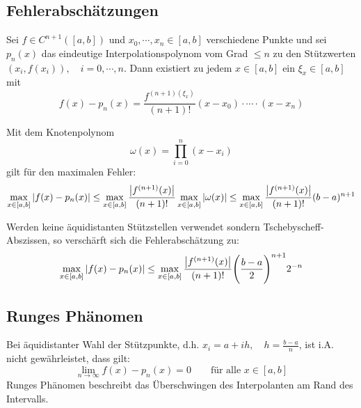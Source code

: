         \subsection{Fehlerabschätzungen}
            Sei \( f \in C^{n+1}([a, b]) \) und \( x_0, \cdots, x_n \in [a, b] \) verschiedene Punkte und sei \( p_n(x) \) das eindeutige Interpolationspolynom vom Grad \( \leq n \) zu den Stützwerten \( (x_i, f(x_i)), \quad i = 0, \cdots, n \). Dann existiert zu jedem \( x \in [a, b] \) ein \( \xi_x \in [a, b] \) mit
            \begin{equation*}
	            f(x) - p_n(x) = \frac{f^{(n + 1)(\xi_x)}}{(n + 1)!} (x - x_0) \cdot \cdots \cdot (x - x_n)
            \end{equation*}
            
            Mit dem Knotenpolynom \[ \omega(x) = \prod_{i = 0}^n (x - x_i) \] gilt für den maximalen Fehler:
            \begin{equation*}
	            \max_{x \in [a, b]} \abs{f(x) - p_n(x)} \leq \max_{x \in [a, b]} \frac{\abs{f^{(n + 1)}(x)}}{(n + 1)!} \max_{x \in [a, b]} \abs{\omega(x)} \leq \max_{x \in [a, b]} \frac{\abs{f^{(n + 1)}(x)}}{(n + 1)!} (b - a)^{n+1}
            \end{equation*}
            
            Werden keine äquidistanten Stützstellen verwendet sondern Tschebyscheff-Abszissen, so verschärft sich die Fehlerabschätzung zu:
            \begin{equation*}
	            \max_{ x \in [a,b] } \abs{f(x) - p_n(x)} \leq \max_{x \in [a, b]} \frac{\abs{f^{(n+1)}(x)}}{(n + 1)!} \Bigg(\frac{b-a}{2}\Bigg)^{n+1} 2^{-n}
            \end{equation*}

        \subsection{Runges Phänomen}
            Bei äquidistanter Wahl der Stützpunkte, d.h. \( x_i = a + ih, \quad h = \frac{b - a}{n} \), ist i.A. nicht gewährleistet, dass gilt:
            \begin{equation*}
	            \lim\limits_{n \rightarrow \infty} f(x) - p_n(x) = 0 \qquad \textrm{für alle } x \in [a, b]
            \end{equation*}
            Runges Phänomen beschreibt das Überschwingen des Interpolanten am Rand des Intervalls.

